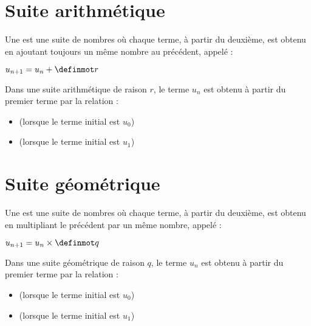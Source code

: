 \documentclass[12pt,a4paper]{article}
\date{}
\title{}
\begin{document}
{}

\section{Suite arithmétique}

\begin{mydef}
	Une  est une suite de nombres où chaque terme, à partir du deuxième, est obtenu en ajoutant toujours un même nombre au précédent, appelé  :
	
	\begin{center}
		$u_{n+1}=u_n + \kw{r}$
	\end{center} 
\end{mydef}

\begin{myprop}
	Dans une suite arithmétique de raison $r$, le terme $u_n$ est obtenu à partir du premier terme par la relation :
	\begin{itemize}
		\item {} (lorsque le terme initial est $u_0$) 
		\item {} (lorsque le terme initial est $u_1$)
	\end{itemize}
\end{myprop}






\section{Suite géométrique}


\begin{mydef}
	Une  est une suite de nombres où chaque terme, à partir du deuxième, est obtenu en multipliant le précédent par un même nombre, appelé  :
	
	\begin{center}
		$u_{n+1}=u_n \times \kw{q}$
	\end{center} 
\end{mydef}

\begin{myprop}
	Dans une suite géométrique de raison $q$, le terme $u_n$ est obtenu à partir du premier terme par la relation :
	\begin{itemize}
		\item {} (lorsque le terme initial est $u_0$) 
		\item {} (lorsque le terme initial est $u_1$)
	\end{itemize}
\end{myprop}



\end{document}
